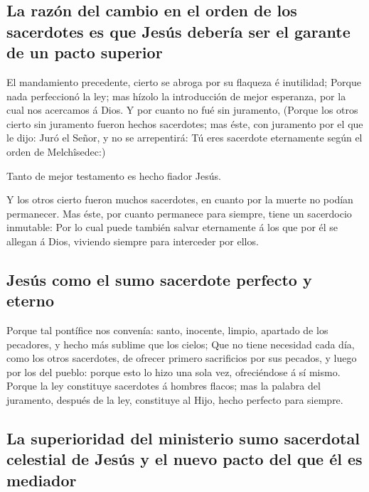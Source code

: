 \hypertarget{la-razuxf3n-del-cambio-en-el-orden-de-los-sacerdotes-es-que-jesuxfas-deberuxeda-ser-el-garante-de-un-pacto-superior}{%
\subsection{La razón del cambio en el orden de los sacerdotes es que
Jesús debería ser el garante de un pacto
superior}\label{la-razuxf3n-del-cambio-en-el-orden-de-los-sacerdotes-es-que-jesuxfas-deberuxeda-ser-el-garante-de-un-pacto-superior}}

 El mandamiento precedente, cierto se abroga por su
flaqueza é inutilidad;  Porque nada perfeccionó la ley; mas
hízolo la introducción de mejor esperanza, por la cual nos acercamos á
Dios.  Y por cuanto no fué sin juramento, 
(Porque los otros cierto sin juramento fueron hechos sacerdotes; mas
éste, con juramento por el que le dijo: Juró el Señor, y no se
arrepentirá: Tú eres sacerdote eternamente según el orden de
Melchîsedec:)

 Tanto de mejor testamento es hecho fiador Jesús.

 Y los otros cierto fueron muchos sacerdotes, en cuanto por
la muerte no podían permanecer.  Mas éste, por cuanto
permanece para siempre, tiene un sacerdocio inmutable:  Por
lo cual puede también salvar eternamente á los que por él se allegan á
Dios, viviendo siempre para interceder por ellos.

\hypertarget{jesuxfas-como-el-sumo-sacerdote-perfecto-y-eterno}{%
\subsection{Jesús como el sumo sacerdote perfecto y
eterno}\label{jesuxfas-como-el-sumo-sacerdote-perfecto-y-eterno}}

 Porque tal pontífice nos convenía: santo, inocente,
limpio, apartado de los pecadores, y hecho más sublime que los cielos;
 Que no tiene necesidad cada día, como los otros
sacerdotes, de ofrecer primero sacrificios por sus pecados, y luego por
los del pueblo: porque esto lo hizo una sola vez, ofreciéndose á sí
mismo.  Porque la ley constituye sacerdotes á hombres
flacos; mas la palabra del juramento, después de la ley, constituye al
Hijo, hecho perfecto para siempre.

\hypertarget{la-superioridad-del-ministerio-sumo-sacerdotal-celestial-de-jesuxfas-y-el-nuevo-pacto-del-que-uxe9l-es-mediador}{%
\subsection{La superioridad del ministerio sumo sacerdotal celestial de
Jesús y el nuevo pacto del que él es
mediador}\label{la-superioridad-del-ministerio-sumo-sacerdotal-celestial-de-jesuxfas-y-el-nuevo-pacto-del-que-uxe9l-es-mediador}}

